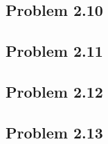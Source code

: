 \documentclass[14pt]{article}
\begin{document}
\subsection{Problem  2.10}

\subsection{Problem  2.11}
\subsection{Problem  2.12}
\subsection{Problem  2.13}

\newpage


\end{document}
